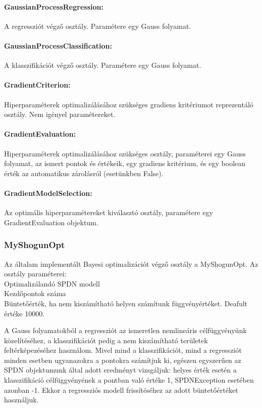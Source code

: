 \paragraph{GaussianProcessRegression:}
A regressziót végző osztály. Paramétere egy Gauss folyamat.
\paragraph{GaussianProcessClassification:}
A klasszifikációt végző osztály. Paramétere egy Gauss folyamat.
\paragraph{GradientCriterion:}
Hiperparaméterek optimalizálásához szükséges gradiens kritériumot reprezentáló osztály. Nem igényel paramétereket.
\paragraph{GradientEvaluation:}
Hiperparaméterek optimalizálásához szükséges osztály, paraméterei egy Gauss folyamat, az ismert pontok és értékeik, egy gradiens kritérium, és egy boolean érték az automatikus zárolásról (esetünkben False).
\paragraph{GradientModelSelection:}
Az optimális hiperparamétereket kiválasztó osztály, paramétere egy GradientEvaluation objektum.

\subsubsection{MyShogunOpt}

Az általam implementált Bayesi optimalizációt végző osztály a MyShogunOpt. Az osztály paraméterei:\\
Optimalizálandó SPDN modell\\
Kezdőpontok száma\\
Büntetőérték, ha nem kiszámítható helyen számítunk függvényértéket. Deafult értéke 10000.

A Gauss folyamatokból a regressziót az ismeretlen nemlineáris célfüggvényünk közelítéséhez, a klasszifikációt pedig a nem kiszámítható területek feltérképezéséhez használom. Mivel mind a klasszifikációt, mind a regressziót minden esetben ugyanazokra a pontokra számítjuk ki, egészen egyszerűen az SPDN objektumunk által adott eredményt vizsgáljuk: helyes érték esetén a klasszifikáció célfüggvényének a pontban való értéke 1, SPDNException esetében azonban -1. Ekkor a regressziós modell frissítéséhez az adott büntetőértéket használjuk.

